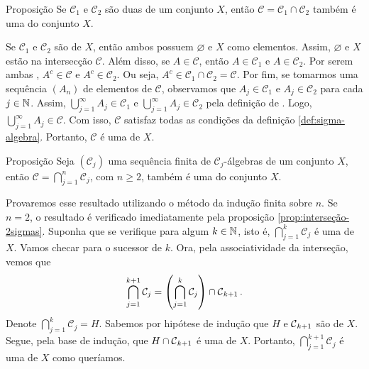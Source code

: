 \begin{env}{Proposição}
\label{prop:interseção-2sigmas}
    Se $\mathcal{C}_1$ e $\mathcal{C}_2$ são duas \sigals de um conjunto $X$, então $\mathcal{C} = \mathcal{C}_1 \cap \mathcal{C}_2$ também é uma \sigal do conjunto $X$.
    \vspace{-0.2cm}
\end{env}
\begin{prova}
    Se $\mathcal{C}_1$ e $\mathcal{C}_2$ são \sigals de $X$, então ambos possuem $\varnothing$ e $X$ como elementos.
    Assim, $\varnothing$ e $X$ estão na intersecção $\mathcal{C}$.
    Além disso, se $A \in \mathcal{C}$, então $A \in \mathcal{C}_1$ e $A \in \mathcal{C}_2$. 
    Por serem ambas \sigals, $A^c \in \mathcal{C}$ e $A^c \in \mathcal{C}_2$.
    Ou seja, $A^c \in \mathcal{C}_1 \cap \mathcal{C}_2 = \mathcal{C}$.
    Por fim, se tomarmos uma sequência $(A_n)$ de elementos de $\mathcal{C}$, observamos que $A_j \in \mathcal{C}_1$ e $A_j \in \mathcal{C}_2$ para cada $j \in \operatorname{\mathbb{N}}$.
    Assim, $\displaystyle \bigcup_{j = 1}^\infty A_j \in \mathcal{C}_1$ e 
    $\displaystyle \bigcup_{j = 1}^\infty A_j \in \mathcal{C}_2$ pela definição de \sigal.
    Logo, $\displaystyle \bigcup_{j = 1}^\infty A_j \in \mathcal{C}$.
    Com isso, $\mathcal{C}$ satisfaz todas as condições da definição \ref{def:sigma-algebra}. 
    Portanto, $\mathcal{C}$ é uma \sigal de $X$.
\end{prova}

\begin{env}{Proposição}
\label{prop:interseção-sigmas}
    Seja $(\mathcal{C}_j)$ uma sequência finita de $\mathcal{C}_j$-álgebras de um conjunto $X$, então 
    $\mathcal{C} = \displaystyle \bigcap_{j =1}^n\mathcal{C}_j$, com $n \geq 2$, também é uma \sigal do conjunto $X$.
    \vspace{-0.2cm}
\end{env}
\begin{prova}
    Provaremos esse resultado utilizando o método da indução finita sobre $n$.
    Se $n = 2$, o resultado é verificado imediatamente pela proposição \ref{prop:interseção-2sigmas}.
    Suponha que se verifique para algum $k \in \operatorname{\mathbb{N}}$, isto é, $\displaystyle \bigcap_{j =1}^k\mathcal{C}_j$ é uma \sigal de $X$.
    Vamos checar para o sucessor de $k$.
    Ora, pela associatividade da interseção, vemos que 
    \begin{align*}
        \displaystyle \bigcap_{j =1}^{k+1}\mathcal{C}_j = \left(\displaystyle \bigcap_{j =1}^k\mathcal{C}_j\right) \cap \operatorname{\mathcal{C}}_{k+1}.
  	\end{align*}
	Denote $\displaystyle \bigcap_{j =1}^k\mathcal{C}_j = H$. 
	Sabemos por hipótese de indução que $H$  e $\operatorname{\mathcal{C}}_{k+1}$ são  \sigals de $X$. 
	Segue, pela base de indução, que $H \cap \operatorname{\mathcal{C}}_{k+1}$ é uma \sigal de $X$.
	Portanto, $\displaystyle \bigcap_{j =1}^{k+1}\mathcal{C}_j$ é uma \sigal de $X$ como queríamos.
\end{prova}


